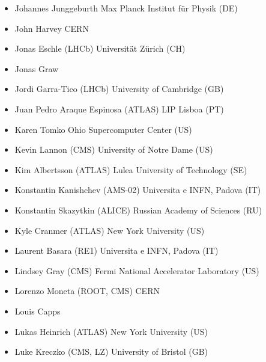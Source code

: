 \begin{itemize}
       \newline Karlsruher Institut f{\"u}r Technologie (DE)
 \item Johannes Junggeburth
       \newline Max Planck Institut f{\"u}r Physik (DE)
 \item John Harvey
       \newline CERN
 \item Jonas Eschle (LHCb)
       \newline Universit{\"a}t Z{\"u}rich (CH)
 \item Jonas Graw
 \item Jordi Garra-Tico (LHCb)
       \newline University of Cambridge (GB)
 \item Juan Pedro Araque Espinosa (ATLAS)
       \newline LIP Lisboa (PT)
 \item Karen Tomko
       \newline Ohio Supercomputer Center (US)
 \item Kevin Lannon (CMS)
       \newline University of Notre Dame (US)
 \item Kim Albertsson (ATLAS)
       \newline Lulea University of Technology (SE)
 \item Konstantin Kanishchev (AMS-02)
       \newline Universita e INFN, Padova (IT)
 \item Konstantin Skazytkin (ALICE)
       \newline Russian Academy of Sciences (RU)
 \item Kyle Cranmer (ATLAS)
       \newline New York University (US)
 \item Laurent Basara (RE1)
       \newline Universita e INFN, Padova (IT)
 \item Lindsey Gray (CMS)
       \newline Fermi National Accelerator Laboratory (US)
 \item Lorenzo Moneta (ROOT, CMS)
       \newline CERN
 \item Louis Capps
 \item Lukas Heinrich (ATLAS)
       \newline New York University (US)
 \item Luke Kreczko (CMS, LZ)
       \newline University of Bristol (GB)

\end{itemize}
